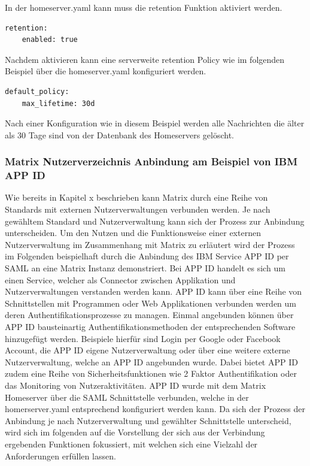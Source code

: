In der homeserver.yaml kann muss die retention Funktion aktiviert werden.

\begin{lstlisting}
retention:
    enabled: true
\end{lstlisting}

Nachdem aktivieren kann eine serverweite retention Policy wie im folgenden Beispiel über die homeserver.yaml konfiguriert werden.

\begin{lstlisting}
default_policy:
    max_lifetime: 30d
\end{lstlisting}

Nach einer Konfiguration wie in diesem Beispiel werden alle Nachrichten die älter als 30 Tage sind von der Datenbank des Homeservers gelöscht.

\subsubsection{Matrix Nutzerverzeichnis Anbindung am Beispiel von IBM APP ID}\label{chapter:vdmf}
Wie bereits in Kapitel x beschrieben kann Matrix durch eine Reihe von Standards mit externen Nutzerverwaltungen verbunden werden.
Je nach gewähltem Standard und Nutzerverwaltung kann sich der Prozess zur Anbindung unterscheiden. Um den Nutzen und die Funktionsweise einer externen Nutzerverwaltung im Zusammenhang mit Matrix zu erläutert wird der Prozess im Folgenden beispielhaft durch die Anbindung des IBM Service APP ID per SAML an eine Matrix Instanz demonstriert. Bei APP ID handelt es sich um einen Service, welcher als Connector zwischen Applikation und Nutzerverwaltungen verstanden werden kann. APP ID kann über eine Reihe von Schnittstellen mit Programmen oder Web Applikationen verbunden werden um deren Authentifikationsprozesse zu managen. Einmal angebunden können über APP ID bausteinartig Authentifikationsmethoden der entsprechenden Software hinzugefügt werden. Beispiele hierfür sind Login per Google oder Facebook Account, die APP ID eigene Nutzerverwaltung oder über eine weitere externe Nutzerverwaltung, welche an APP ID angebunden wurde. Dabei bietet APP ID zudem eine Reihe von Sicherheitsfunktionen wie 2 Faktor Authentifikation oder das Monitoring von Nutzeraktivitäten.
APP ID wurde mit dem Matrix Homeserver über die SAML Schnittstelle verbunden, welche in der homerserver.yaml entsprechend konfiguriert werden kann. Da sich der Prozess der Anbindung je nach Nutzerverwaltung und gewählter Schnittstelle unterscheid, wird sich im folgenden auf die Vorstellung der sich aus der Verbindung ergebenden Funktionen fokussiert, mit welchen sich eine Vielzahl der Anforderungen erfüllen lassen.

